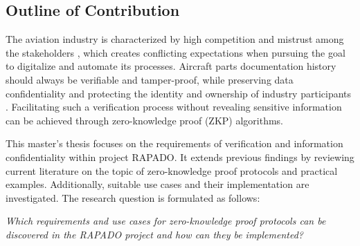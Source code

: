 \subsection{Outline of Contribution}
The aviation industry is characterized by high competition and mistrust among the stakeholders \citep{Chatzi2019TDoC}, which creates conflicting expectations when pursuing the goal to digitalize and automate its processes. Aircraft parts documentation history should always be verifiable and tamper-proof, while preserving data confidentiality and protecting the identity and ownership of industry participants \citep{Wickboldt2019BlockchainFW}. Facilitating such a verification process without revealing sensitive information can be achieved through zero-knowledge proof (ZKP) algorithms.

This master's thesis focuses on the requirements of verification and information confidentiality within project RAPADO. It extends previous findings by reviewing current literature on the topic of zero-knowledge proof protocols and practical examples. Additionally, suitable use cases and their implementation are investigated. The research question is formulated as follows:

\textit{Which requirements and use cases for zero-knowledge proof protocols can be discovered in the RAPADO project and how can they be implemented?} 

